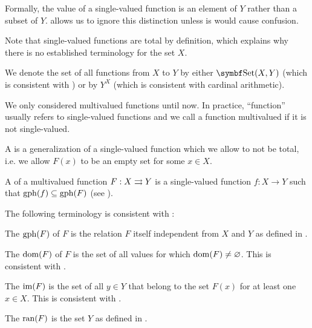 \begin{definition}
\begin{defenum}[series=def:function]
    Formally, the value of a single-valued function is an element of \( Y \) rather than a subset of \( Y \).  allows us to ignore this distinction unless is would cause confusion.

    Note that single-valued functions are total by definition, which explains why there is no established terminology for the set \( X \).

    We denote the set of all functions from \( X \) to \( Y \) by either \( \Cat{Set}(X, Y) \) (which is consistent with ) or by \( Y^X \) (which is consistent with cardinal arithmetic).

     We only considered multivalued functions until now. In practice, \enquote{function} usually refers to single-valued functions and we call a function multivalued if it is not single-valued.

     A  is a generalization of a single-valued function which we allow to not be total, i.e. we allow \( F(x) \) to be an empty set for some \( x \in X \).

     A  of a multivalued function \( F: X \rightrightarrows Y \) is a single-valued function \( f: X \to Y \) such that \( \operatorname{gph}(f) \subseteq \operatorname{gph}(F) \) (see ).
  \end{defenum}

  The following terminology is consistent with :
  \begin{defenum}[resume=def:function]
     The  \( \operatorname{gph}(F) \) of \( F \) is the relation \( F \) itself independent from \( X \) and \( Y \) as defined in .

     The  \( \operatorname{dom}(F) \) of \( F \) is the set of all values for which \( \operatorname{dom}(F) \neq \varnothing \). This is consistent with .

     The  \( \operatorname{im}(F) \) is the set of all \( y \in Y \) that belong to the set \( F(x) \) for at least one \( x \in X \). This is consistent with .

     The  \( \operatorname{ran}(F) \) is the set \( Y \) as defined in .


\end{defenum}
\end{definition}
